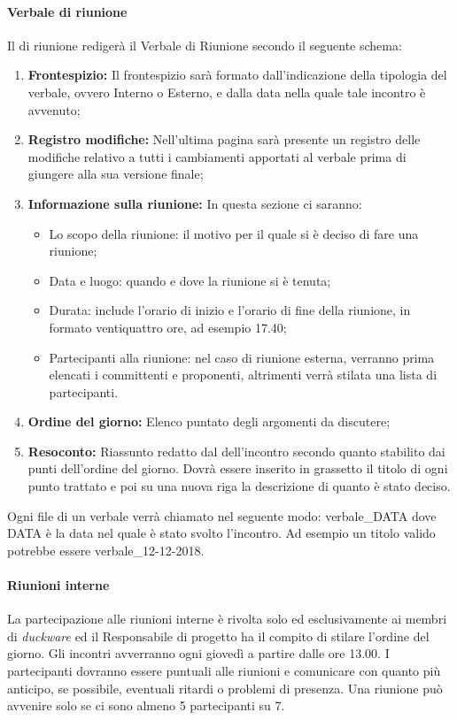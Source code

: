 \paragraph{Verbale di riunione}
Il  di riunione redigerà il Verbale di Riunione secondo il seguente schema:
\begin{enumerate}
    \item \textbf{Frontespizio: }Il frontespizio sarà formato dall’indicazione della tipologia del verbale, ovvero Interno o Esterno, e dalla data nella quale tale incontro è avvenuto;
    \item \textbf{Registro modifiche: }Nell'ultima pagina sarà presente un registro delle modifiche relativo a tutti i cambiamenti apportati al verbale prima di giungere alla sua versione finale;
    \item \textbf{Informazione sulla riunione: }In questa sezione ci saranno:
    \begin{itemize}
        \item Lo scopo della riunione: il motivo per il quale si è deciso di fare una riunione;
        \item Data e luogo: quando e dove la riunione si è tenuta;
        \item Durata: include l’orario di inizio e l’orario di fine della riunione, in formato ventiquattro ore, ad esempio 17.40;
        \item Partecipanti alla riunione: nel caso di riunione esterna, verranno prima elencati i committenti e proponenti, altrimenti verrà stilata una lista di partecipanti.
    \end{itemize}
    \item \textbf{Ordine del giorno: }Elenco puntato degli argomenti da discutere;
    \item \textbf{Resoconto: }Riassunto redatto dal  dell’incontro secondo quanto stabilito dai punti dell'ordine del giorno. Dovrà essere inserito in grassetto il titolo di ogni punto trattato e poi su una nuova riga la descrizione di quanto è stato deciso.
\end{enumerate}
Ogni file di un verbale verrà chiamato nel seguente modo: verbale\_{}DATA dove DATA è la data nel quale è stato svolto l'incontro. Ad esempio un titolo valido potrebbe essere verbale\_{}12-12-2018.

\paragraph{Riunioni interne}
La partecipazione alle riunioni interne è rivolta solo ed esclusivamente ai membri di \emph{duckware} ed il Responsabile di progetto ha il compito di stilare l’ordine del giorno. Gli incontri avverranno ogni giovedì a partire dalle ore 13.00. I partecipanti dovranno essere puntuali alle riunioni e comunicare con quanto più anticipo, se possibile, eventuali ritardi o problemi di presenza. Una riunione può avvenire solo se ci sono almeno 5 partecipanti su 7.

